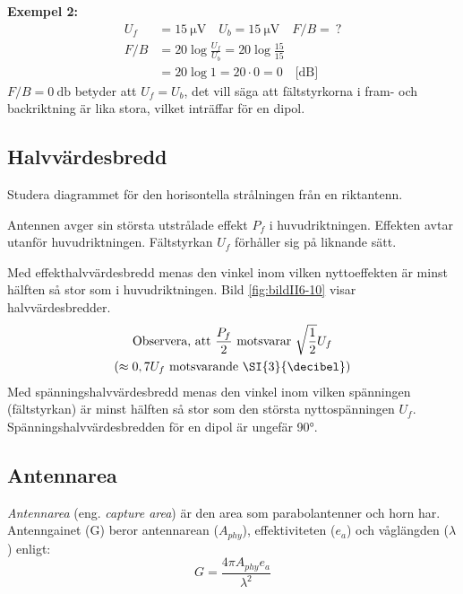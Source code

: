 \noindent\textbf{Exempel 2:}
\begin{align*}
  U_f &= \SI{15}{\micro\volt} \quad U_b = \SI{15}{\micro\volt} \quad F/B =\ ? \\
  F/B &= 20 \log\frac{U_f}{U_b} = 20 \log\frac{15}{15} \\
  &= 20 \log 1 = 20 \cdot 0 = 0 \quad \text{[dB]}
\end{align*}
\(F/B = \SI{0}{\decibel}\) betyder att \(U_f = U_b\), det vill säga att
fältstyrkorna i fram- och backriktning är lika stora, vilket inträffar för en
dipol.

\subsection{Halvvärdesbredd}

Studera diagrammet för den horisontella strålningen från en riktantenn.

Antennen avger sin största utstrålade effekt \(P_f\) i huvudriktningen.
Effekten avtar utanför huvudriktningen.
Fältstyrkan \(U_f\) förhåller sig på liknande sätt.

Med effekthalvvärdesbredd menas den vinkel inom vilken nyttoeffekten
är minst hälften så stor som i huvudriktningen.
Bild \ref{fig:bildII6-10} visar halvvärdesbredder.
\begin{gather*}
  \text{Observera, att } \frac{P_f}{2} \text{ motsvarar }
  \sqrt{\frac{1}{2}}U_f \\
  ( \approx 0,7 U_f \text{ motsvarande \SI{3}{\decibel}})
\end{gather*}
Med spänningshalvvärdesbredd menas den vinkel inom vilken spänningen
(fältstyrkan) är minst hälften så stor som den största nyttospänningen \(U_f\).
Spänningshalvvärdesbredden för en dipol är ungefär \ang{90}.


\subsection{Antennarea}

\emph{Antennarea} (eng. \emph{capture area}) är den area som parabolantenner
och horn har.
Antenngainet (G) beror antennarean (\(A_{phy}\)), effektiviteten (\(e_a\)) och
våglängden (\(\lambda\)) enligt:
\[ G = \frac{4\pi A_{phy}e_a}{\lambda^2} \]
